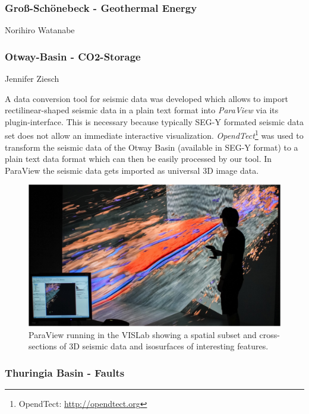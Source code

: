 \subsubsection{Gro{\ss}-Sch\"onebeck - Geothermal Energy}
\label{grouss-schoenebeck---geothermal-energy}

Norihiro Watanabe

\subsubsection{Otway-Basin - CO2-Storage}
\label{otway-basin---co2-storage}

Jennifer Ziesch

A data conversion tool for seismic data was developed \cite{bilke:simpleseismicreader} which allows to import rectilinear-shaped seismic data in a plain text format into \emph{ParaView} via its plugin-interface. This is necessary because typically SEG-Y formated seismic data set does not allow an immediate interactive visualization. \emph{OpendTect}\footnote{OpendTect: \url{http://opendtect.org}} was used to transform the seismic data of the Otway Basin (available in SEG-Y format) to a plain text data format which can then be easily processed by our tool. In ParaView the seismic data gets imported as universal 3D image data.

\begin{figure}
  \includegraphics[width=\linewidth]{images/seismic.jpg}
\caption{ParaView running in the VISLab showing a spatial subset and cross-sections of 3D seismic data and isosurfaces of interesting features.}
\label{fig:seismic}
\end{figure}

\subsubsection{Thuringia Basin - Faults}
\label{thuringia-basin---faults}

